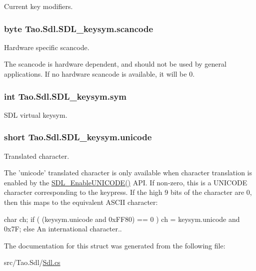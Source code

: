 Current key modifiers. 

\hypertarget{struct_tao_1_1_sdl_1_1_s_d_l__keysym_a3ba972808fbb5cfb97404c6cc03d714f}{
\subsubsection[{scancode}]{\setlength{\rightskip}{0pt plus 5cm}byte {\bf Tao.Sdl.SDL\_\-keysym.scancode}}}
\label{struct_tao_1_1_sdl_1_1_s_d_l__keysym_a3ba972808fbb5cfb97404c6cc03d714f}


Hardware specific scancode. 

The scancode is hardware dependent, and should not be used by general applications. If no hardware scancode is available, it will be 0. \hypertarget{struct_tao_1_1_sdl_1_1_s_d_l__keysym_a4169071617ea2b244051e777821fa510}{
\subsubsection[{sym}]{\setlength{\rightskip}{0pt plus 5cm}int {\bf Tao.Sdl.SDL\_\-keysym.sym}}}
\label{struct_tao_1_1_sdl_1_1_s_d_l__keysym_a4169071617ea2b244051e777821fa510}


SDL virtual keysym. 

\hypertarget{struct_tao_1_1_sdl_1_1_s_d_l__keysym_a4a37b543b411bdd71204b270e3f0bd76}{
\subsubsection[{unicode}]{\setlength{\rightskip}{0pt plus 5cm}short {\bf Tao.Sdl.SDL\_\-keysym.unicode}}}
\label{struct_tao_1_1_sdl_1_1_s_d_l__keysym_a4a37b543b411bdd71204b270e3f0bd76}


Translated character. 

The 'unicode' translated character is only available when character translation is enabled by the \hyperlink{_sdl_8cs_a84ff6db83e36f31aa5b5643cc18b1364}{SDL\_\-EnableUNICODE()} API. If non-\/zero, this is a UNICODE character corresponding to the keypress. If the high 9 bits of the character are 0, then this maps to the equivalent ASCII character: 


\begin{DoxyCode}
                        char ch;
                if ( (keysym.unicode and 0xFF80) == 0 ) {
                        ch = keysym.unicode and 0x7F;
                } else {
                        An international character..
                }
\end{DoxyCode}
 

The documentation for this struct was generated from the following file:\begin{DoxyCompactItemize}
\item 
src/Tao.Sdl/\hyperlink{_sdl_8cs}{Sdl.cs}\end{DoxyCompactItemize}
